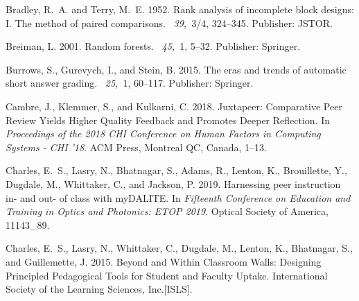 \documentclass[notitlepage,12pt]{jedm}
\begin{document}
\begin{thebibliography}{}
{\sc Bradley, R.~A.} {\sc and} {\sc Terry, M.~E.} 1952.
\newblock Rank analysis of incomplete block designs: {I}. {The} method of
  paired comparisons.
~{\em 39,\/}~3/4, 324--345.
\newblock Publisher: JSTOR.

{\sc Breiman, L.} 2001.
\newblock Random forests.
~{\em 45,\/}~1, 5--32.
\newblock Publisher: Springer.

{\sc Burrows, S.}, {\sc Gurevych, I.}, {\sc and} {\sc Stein, B.} 2015.
\newblock The eras and trends of automatic short answer grading.
~{\em 25,\/}~1, 60--117.
\newblock Publisher: Springer.

{\sc Cambre, J.}, {\sc Klemmer, S.}, {\sc and} {\sc Kulkarni, C.} 2018.
\newblock Juxtapeer: {Comparative} {Peer} {Review} {Yields} {Higher} {Quality}
  {Feedback} and {Promotes} {Deeper} {Reflection}.
\newblock In {\em Proceedings of the 2018 {CHI} {Conference} on {Human}
  {Factors} in {Computing} {Systems} - {CHI} '18}. ACM Press, Montreal QC,
  Canada, 1--13.

{\sc Charles, E.~S.}, {\sc Lasry, N.}, {\sc Bhatnagar, S.}, {\sc Adams, R.},
  {\sc Lenton, K.}, {\sc Brouillette, Y.}, {\sc Dugdale, M.}, {\sc Whittaker,
  C.}, {\sc and} {\sc Jackson, P.} 2019.
\newblock Harnessing peer instruction in- and out- of class with {myDALITE}.
\newblock In {\em Fifteenth {Conference} on {Education} and {Training} in
  {Optics} and {Photonics}: {ETOP} 2019}. Optical Society of America,
  11143\_89.

{\sc Charles, E.~S.}, {\sc Lasry, N.}, {\sc Whittaker, C.}, {\sc Dugdale, M.},
  {\sc Lenton, K.}, {\sc Bhatnagar, S.}, {\sc and} {\sc Guillemette, J.} 2015.
\newblock Beyond and {Within} {Classroom} {Walls}: {Designing} {Principled}
  {Pedagogical} {Tools} for {Student} and {Faculty} {Uptake}.
\newblock International Society of the Learning Sciences, Inc.[ISLS].


\end{thebibliography}
\end{document}
